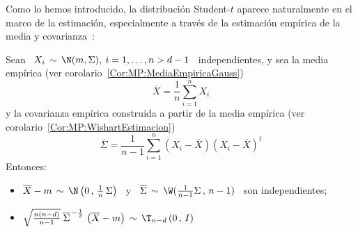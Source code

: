 Como lo hemos introducido, la distribuci\'on Student-$t$ aparece naturalmente en
el  marco  de la  estimaci\'on,  especialmente  a  trav\'es de  la  estimaci\'on
emp\'irica  de la  media  y covarianza~\cite{Mui82,  GupNag99, BilBre99,  And03,
  Seb04}:
%
\begin{teorema}%
%
  Sean  \  $X_i \,  \sim  \,  \N(m,\Sigma), \:  i  =  1, \ldots  ,  n  > d-1$  \
  independientes,       y      sea       la       media      emp\'irica       (ver
  corolario~\ref{Cor:MP:MediaEmpiricaGauss})
  \[
  \overline{X} = \frac{1}{n} \sum_{i=1}^n X_i
  \]
  y  la  covarianza emp\'irica  construida  a partir  de  la  media emp\'irica  (ver
  corolario~\ref{Cor:MP:WishartEstimacion})
  \[
  \overline{\Sigma}  =  \frac{1}{n-1}  \sum_{i=1}^n  \left( X_i  -  \overline{X}
  \right) \left( X_i - \overline{X} \right)^t
  \]
  Entonces:
  \begin{itemize}
  \item $\overline{X} -  m \, \sim \,  \N\left( 0 \, , \,  \frac{1}{n} \, \Sigma
    \right)$ \ y  \ $\overline{\Sigma} \, \sim \, \W(  \frac{1}{n-1} \Sigma \, ,
    \, n-1 ) $ \ son independientes;
  \item $\sqrt{\frac{n (n-d)}{n-1}} \: \overline{\Sigma}^{\, -\frac12} \, \left(
      \overline{X} - m \right) \, \sim \, \T_{n-d}\left( 0 \, , \, I \right)$
  \end{itemize}
\end{teorema}
%
